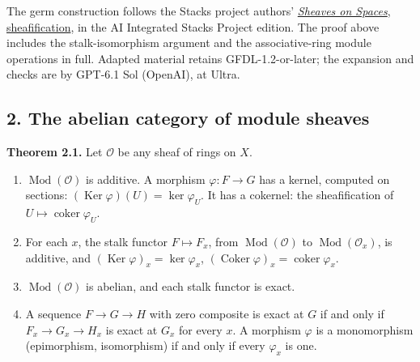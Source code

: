 \documentclass[
  english,
  11pt,
  a4paper,
]{article}
\providecommand{\tightlist}{%
  \setlength{\itemsep}{0pt}\setlength{\parskip}{0pt}}
\begin{document}
The germ construction follows the Stacks project authors'
\href{https://github.com/KokunoYumeto/unofficial-stacks-project-ai-drafts/blob/565b10e987aba5969b21145a0833f42d69f96790/sheaves.tex\#L1522}{\emph{Sheaves
on Spaces}, sheafification}, in the AI Integrated Stacks Project
edition. The proof above includes the stalk-isomorphism argument and the
associative-ring module operations in full. Adapted material retains
GFDL-1.2-or-later; the expansion and checks are by GPT-6.1 Sol (OpenAI),
at Ultra.

\subsection{2. The abelian category of module
sheaves}\label{sheaves-of-modules-on-a-ringed-space--2-the-abelian-category-of-module-sheaves}

\textbf{Theorem 2.1.} Let \(\mathcal O\) be any sheaf of rings on \(X\).

\begin{enumerate}
\tightlist
\item
  \(\operatorname{Mod}(\mathcal O)\) is additive. A morphism
  \(\varphi:F\to G\) has a kernel, computed on sections:
  \((\operatorname{Ker}\varphi)(U)=\ker\varphi_U\). It has a cokernel:
  the sheafification of \(U\mapsto\operatorname{coker}\varphi_U\).
\item
  For each \(x\), the stalk functor \(F\mapsto F_x\), from
  \(\operatorname{Mod}(\mathcal O)\) to
  \(\operatorname{Mod}(\mathcal O_x)\), is additive, and
  \((\operatorname{Ker}\varphi)_x=\ker\varphi_x\),
  \((\operatorname{Coker}\varphi)_x=\operatorname{coker}\varphi_x\).
\item
  \(\operatorname{Mod}(\mathcal O)\) is abelian, and each stalk functor
  is exact.
\item
  A sequence \(F\to G\to H\) with zero composite is exact at \(G\) if
  and only if \(F_x\to G_x\to H_x\) is exact at \(G_x\) for every \(x\).
  A morphism \(\varphi\) is a monomorphism (epimorphism, isomorphism) if
  and only if every \(\varphi_x\) is one.
\end{enumerate}
\end{document}
